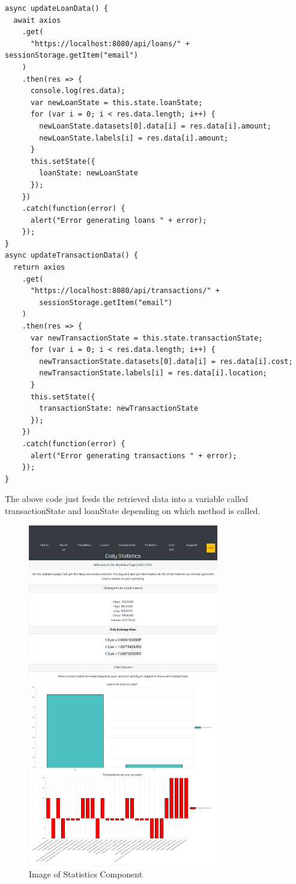 \begin{verbatim}
async updateLoanData() {
  await axios
    .get(
      "https://localhost:8080/api/loans/" + sessionStorage.getItem("email")
    )
    .then(res => {
      console.log(res.data);
      var newLoanState = this.state.loanState;
      for (var i = 0; i < res.data.length; i++) {
        newLoanState.datasets[0].data[i] = res.data[i].amount;
        newLoanState.labels[i] = res.data[i].amount;
      }
      this.setState({
        loanState: newLoanState
      });
    })
    .catch(function(error) {
      alert("Error generating loans " + error);
    });
}
async updateTransactionData() {
  return axios
    .get(
      "https://localhost:8080/api/transactions/" +
        sessionStorage.getItem("email")
    )
    .then(res => {
      var newTransactionState = this.state.transactionState;
      for (var i = 0; i < res.data.length; i++) {
        newTransactionState.datasets[0].data[i] = res.data[i].cost;
        newTransactionState.labels[i] = res.data[i].location;
      }
      this.setState({
        transactionState: newTransactionState
      });
    })
    .catch(function(error) {
      alert("Error generating transactions " + error);
    });
}
\end{verbatim}
The above code just feeds the retrieved data into a variable called transactionState and loanState depending on which method
is called.
\begin{figure}[H]
\includegraphics[width=\textwidth,height=15cm]{img/statisticscomponent.png}
\caption{Image of Statistics Component}
\label{fig:Image of statistics component}
\end{figure}
